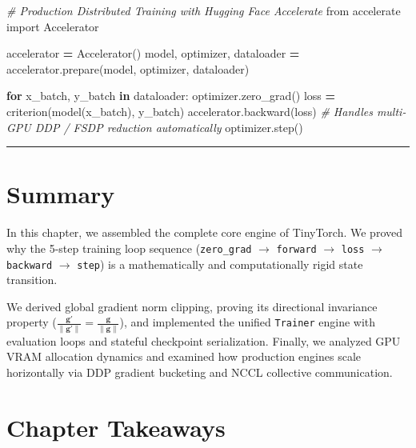 \documentclass[
  letterpaper,
]{scrbook}
\newenvironment{Shaded}{\begin{snugshade}}{\end{snugshade}}
\newcommand{\CommentTok}[1]{\textcolor[rgb]{0.56,0.35,0.01}{\textit{#1}}}
\newcommand{\ControlFlowTok}[1]{\textcolor[rgb]{0.13,0.29,0.53}{\textbf{#1}}}
\newcommand{\ImportTok}[1]{#1}
\newcommand{\KeywordTok}[1]{\textcolor[rgb]{0.13,0.29,0.53}{\textbf{#1}}}
\newcommand{\NormalTok}[1]{#1}
\newcommand{\OperatorTok}[1]{\textcolor[rgb]{0.81,0.36,0.00}{\textbf{#1}}}
\begin{document}

\begin{Shaded}
\begin{Highlighting}[]
\CommentTok{\# Production Distributed Training with Hugging Face Accelerate}
\ImportTok{from}\NormalTok{ accelerate }\ImportTok{import}\NormalTok{ Accelerator}

\NormalTok{accelerator }\OperatorTok{=}\NormalTok{ Accelerator()}
\NormalTok{model, optimizer, dataloader }\OperatorTok{=}\NormalTok{ accelerator.prepare(model, optimizer, dataloader)}

\ControlFlowTok{for}\NormalTok{ x\_batch, y\_batch }\KeywordTok{in}\NormalTok{ dataloader:}
\NormalTok{    optimizer.zero\_grad()}
\NormalTok{    loss }\OperatorTok{=}\NormalTok{ criterion(model(x\_batch), y\_batch)}
\NormalTok{    accelerator.backward(loss)  }\CommentTok{\# Handles multi{-}GPU DDP / FSDP reduction automatically}
\NormalTok{    optimizer.step()}
\end{Highlighting}
\end{Shaded}

\begin{center}\rule{0.5\linewidth}{0.5pt}\end{center}

\section{Summary}\label{summary-8}

In this chapter, we assembled the complete core engine of TinyTorch. We
proved why the 5-step training loop sequence (\texttt{zero\_grad}
\(\to\) \texttt{forward} \(\to\) \texttt{loss} \(\to\) \texttt{backward}
\(\to\) \texttt{step}) is a mathematically and computationally rigid
state transition.

We derived global gradient norm clipping, proving its directional
invariance property
(\(\frac{\mathbf{g}'}{\|\mathbf{g}'\|} = \frac{\mathbf{g}}{\|\mathbf{g}\|}\)),
and implemented the unified \texttt{Trainer} engine with evaluation
loops and stateful checkpoint serialization. Finally, we analyzed GPU
VRAM allocation dynamics and examined how production engines scale
horizontally via DDP gradient bucketing and NCCL collective
communication.

\section{Chapter Takeaways}\label{chapter-takeaways-8}
\end{document}
